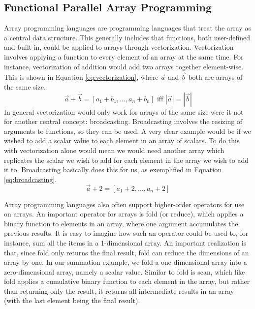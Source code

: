     \subsection{Functional Parallel Array Programming} \label{sec:bg_array}
        Array programming languages are programming languages that treat the array as a central data structure.
        This generally includes that functions, both user-defined and built-in, could be applied to arrays through vectorization.
        Vectorization involves applying a function to every element of an array at the same time.
        For instance, vectorization of addition would add two arrays together element-wise.
        This is shown in Equation \ref{eq:vectorization}, where $\vec{a}$ and $\vec{b}$ both are arrays of the same size.
        \begin{equation} \label{eq:vectorization}
            \vec{a}+\vec{b}=[a_1+b_1,\dots,a_n+b_n]\text{ iff }|\vec{a}|=|\vec{b}|
        \end{equation}
        In general vectorization would only work for arrays of the same size were it not for another central concept: broadcasting.
        Broadcasting involves the resizing of arguments to functions, so they can be used.
        A very clear example would be if we wished to add a scalar value to each element in an array of scalars.
        To do this with vectorization alone would mean we would need another array which replicates the scalar we wish to add for each element in the array we wish to add it to.
        Broadcasting basically does this for us, as exemplified in Equation \ref{eq:broadcasting}.
        \begin{equation} \label{eq:broadcasting}
            \vec{a}+2=[a_1+2,\dots,a_n+2]
        \end{equation}
        
        Array programming languages also often support higher-order operators for use on arrays.
        An important operator for arrays is fold (or reduce), which applies a binary function to elements in an array, where one argument accumulates the previous results.
        It is easy to imagine how such an operator could be used to, for instance, sum all the items in a 1-dimensional array.
        An important realization is that, since fold only returns the final result, fold can reduce the dimensions of an array by one.
        In our summation example, we fold a one-dimensional array into a zero-dimensional array, namely a scalar value.
        Similar to fold is scan, which like fold applies a cumulative binary function to each element in the array, but rather than returning only the result, it returns all intermediate results in an array (with the last element being the final result).

